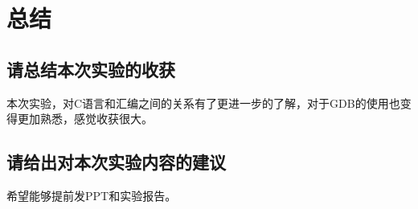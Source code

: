 \section{总结}

\subsection{请总结本次实验的收获}
本次实验，对C语言和汇编之间的关系有了更进一步的了解，对于GDB的使用也变得更加熟悉，感觉收获很大。

\subsection{请给出对本次实验内容的建议}
希望能够提前发PPT和实验报告。